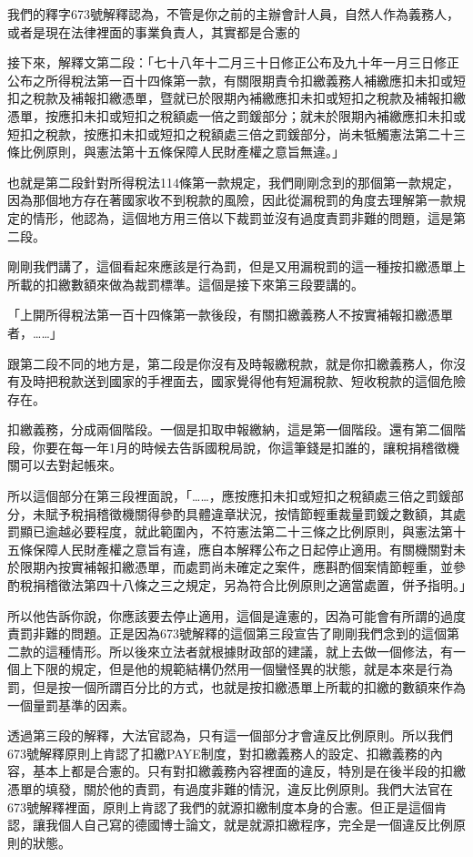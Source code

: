 \documentclass[oneside,sub3section]{ctexbook}
\begin{document}
我們的釋字673號解釋認為，不管是你之前的主辦會計人員，自然人作為義務人，或者是現在法律裡面的事業負責人，其實都是合憲的

接下來，解釋文第二段：「七十八年十二月三十日修正公布及九十年一月三日修正公布之所得稅法第一百十四條第一款，有關限期責令扣繳義務人補繳應扣未扣或短扣之稅款及補報扣繳憑單，暨就已於限期內補繳應扣未扣或短扣之稅款及補報扣繳憑單，按應扣未扣或短扣之稅額處一倍之罰鍰部分；就未於限期內補繳應扣未扣或短扣之稅款，按應扣未扣或短扣之稅額處三倍之罰鍰部分，尚未牴觸憲法第二十三條比例原則，與憲法第十五條保障人民財產權之意旨無違。」

也就是第二段針對所得稅法114條第一款規定，我們剛剛念到的那個第一款規定，因為那個地方存在著國家收不到稅款的風險，因此從漏稅罰的角度去理解第一款規定的情形，他認為，這個地方用三倍以下裁罰並沒有過度責罰非難的問題，這是第二段。

剛剛我們講了，這個看起來應該是行為罰，但是又用漏稅罰的這一種按扣繳憑單上所載的扣繳數額來做為裁罰標準。這個是接下來第三段要講的。

「上開所得稅法第一百十四條第一款後段，有關扣繳義務人不按實補報扣繳憑單者，\ldots\ldots」

跟第二段不同的地方是，第二段是你沒有及時報繳稅款，就是你扣繳義務人，你沒有及時把稅款送到國家的手裡面去，國家覺得他有短漏稅款、短收稅款的這個危險存在。

扣繳義務，分成兩個階段。一個是扣取申報繳納，這是第一個階段。還有第二個階段，你要在每一年1月的時候去告訴國稅局說，你這筆錢是扣誰的，讓稅捐稽徵機關可以去對起帳來。

所以這個部分在第三段裡面說，「\ldots\ldots，應按應扣未扣或短扣之稅額處三倍之罰鍰部分，未賦予稅捐稽徵機關得參酌具體違章狀況，按情節輕重裁量罰鍰之數額，其處罰顯已逾越必要程度，就此範圍內，不符憲法第二十三條之比例原則，與憲法第十五條保障人民財產權之意旨有違，應自本解釋公布之日起停止適用。有關機關對未於限期內按實補報扣繳憑單，而處罰尚未確定之案件，應斟酌個案情節輕重，並參酌稅捐稽徵法第四十八條之三之規定，另為符合比例原則之適當處置，併予指明。」

所以他告訴你說，你應該要去停止適用，這個是違憲的，因為可能會有所謂的過度責罰非難的問題。正是因為673號解釋的這個第三段宣告了剛剛我們念到的這個第二款的這種情形。所以後來立法者就根據財政部的建議，就上去做一個修法，有一個上下限的規定，但是他的規範結構仍然用一個蠻怪異的狀態，就是本來是行為罰，但是按一個所謂百分比的方式，也就是按扣繳憑單上所載的扣繳的數額來作為一個量罰基準的因素。

透過第三段的解釋，大法官認為，只有這一個部分才會違反比例原則。所以我們673號解釋原則上肯認了扣繳PAYE制度，對扣繳義務人的設定、扣繳義務的內容，基本上都是合憲的。只有對扣繳義務內容裡面的違反，特別是在後半段的扣繳憑單的填發，關於他的責罰，有過度非難的情況，違反比例原則。我們大法官在673號解釋裡面，原則上肯認了我們的就源扣繳制度本身的合憲。但正是這個肯認，讓我個人自己寫的德國博士論文，就是就源扣繳程序，完全是一個違反比例原則的狀態。
\end{document}
